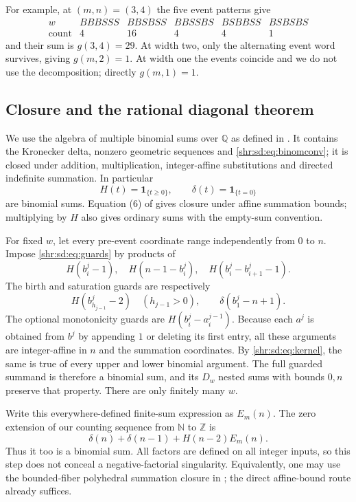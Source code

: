 \documentclass[11pt,letterpaper]{article}
\numberwithin{equation}{section}
\theoremstyle{definition}
\newcommand{\Q}{\mathbb Q}
\newcommand{\N}{\mathbb N}
\newcommand{\1}{\mathbf 1}
\newcommand{\Z}{\mathbb Z}
\newcommand{\del}{\delta}
\begin{document}
For example, at $(m,n)=(3,4)$ the five event patterns give
\[
\begin{array}{c|rrrrr}
 w&BBBSSS&BBSBSS&BBSSBS&BSBBSS&BSBSBS\\\hline
 \text{count}&4&16&4&4&1
\end{array}
\]
and their sum is $g(3,4)=29$. At width two, only the alternating event word survives, giving $g(m,2)=1$. At width one the events coincide and we do not use the decomposition; directly $g(m,1)=1$.

\subsection{Closure and the rational diagonal theorem}
We use the algebra of multiple binomial sums over $\Q$ as defined in \cite[Definition 1.1]{BLS}. It contains the Kronecker delta, nonzero geometric sequences and \eqref{shr:sd:eq:binomconv}; it is closed under addition, multiplication, integer-affine substitutions and directed indefinite summation. In particular
\[
 H(t)=\mathbf1_{\{t\ge0\}},\qquad \del(t)=\mathbf1_{\{t=0\}}
\]
are binomial sums. Equation (6) of \cite{BLS} gives closure under affine summation bounds; multiplying by $H$ also gives ordinary sums with the empty-sum convention.

For fixed $w$, let every pre-event coordinate range independently from $0$ to $n$. Impose \eqref{shr:sd:eq:guards} by products of
\[
 H(b^j_i-1),\quad H(n-1-b^j_i),\quad
 H(b^j_i-b^j_{i+1}-1).
\]
The birth and saturation guards are respectively
\[
 H(b^j_{h_{j-1}}-2)\quad(h_{j-1}>0),
 \qquad\del(b^j_1-n+1).
\]
The optional monotonicity guards are $H(b^j_i-a^{j-1}_i)$. Because each $a^j$ is obtained from $b^j$ by appending $1$ or deleting its first entry, all these arguments are integer-affine in $n$ and the summation coordinates. By \eqref{shr:sd:eq:kernel}, the same is true of every upper and lower binomial argument. The full guarded summand is therefore a binomial sum, and its $D_w$ nested sums with bounds $0,n$ preserve that property. There are only finitely many $w$.

Write this everywhere-defined finite-sum expression as $E_m(n)$. The zero extension of our counting sequence from $\N$ to $\Z$ is
\begin{equation}\label{shr:sd:eq:extension}
 \del(n)+\del(n-1)+H(n-2)E_m(n).
\end{equation}
Thus it too is a binomial sum. All factors are defined on all integer inputs, so this step does not conceal a negative-factorial singularity. Equivalently, one may use the bounded-fiber polyhedral summation closure in \cite[Proposition 3.12]{BLS}; the direct affine-bound route already suffices.
\end{document}
